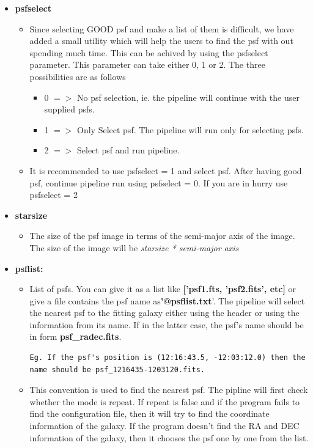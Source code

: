 \documentclass[a4paper,12pt]{article}
\begin{document}
\begin{itemize}
\item \textbf{psfselect}
\begin{itemize}
\item[] Since selecting GOOD psf and make a list of them is difficult, we have added a small utility which will help the users to find the psf with out spending much time. This can be achived by using the psfselect parameter. This parameter can take either 0, 1 or 2. The three possibilities are as follows
\begin{itemize}
\item 0 $=>$ No psf selection, ie. the pipeline will continue with the user supplied psfs.
\item 1 $=>$ Only Select psf. The pipeline will run only for selecting psfs.
\item 2 $=>$ Select psf and run pipeline.
\end{itemize}
\item[] It is recommended to use psfselect = 1 and select psf. After having
 good psf, continue pipeline run using psfselect = 0. If you are in hurry
 use psfselect = 2
\end{itemize}

\item \textbf{starsize}
\begin{itemize}
\item[] The size of the psf image in terms of the semi-major axis of the image. The size of the image will be\textit{ starsize * semi-major axis}
\end{itemize}

\item \textbf{psflist:}
\begin{itemize}
\item[] List of psfs. You can give it as a list like\textbf{ ['psf1.fts, 'psf2.fits', etc]} or give a file contains the psf name as\textbf{'@psflist.txt}'. The pipeline will select the nearest psf to the fitting galaxy either using the header or using the information from its name. If in the latter case, the psf's name should be in form\textbf{
 psf\_radec.fits}.
\begin{verbatim}Eg. If the psf's position is (12:16:43.5, -12:03:12.0) then the 
name should be psf_1216435-1203120.fits.
\end{verbatim}
\item[]  This convention is used to find the nearest psf. The pipline will first check whether the mode is repeat. If repeat is false and if the program fails to find the configuration file, then it will try to find the coordinate information of the galaxy. If the program doesn't find the RA and DEC information of the galaxy, then it chooses the psf one by one from the list.
\end{itemize}


\end{itemize}
\end{document}
